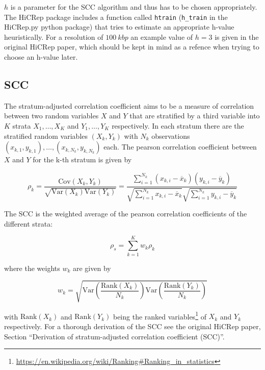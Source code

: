 \(h\) is a parameter for the SCC algorithm and thus has to be chosen appropriately. The HiCRep package includes a function called \verb|htrain| (\verb|h_train| in the HiCRep.py python package) that tries to estimate an appropriate h-value heuristically. For a resolution of \(\SI{100}{kbp}\) an example value of \( h = 3 \) is given in the original HiCRep paper, which should be kept in mind as a refence when trying to choose an h-value later.


\subsection{SCC} %
\label{subsec:scc}

The stratum-adjusted correlation coefficient aims to be a measure of correlation between two random variables \(X\) and \(Y\) that are stratified by a third variable into \(K\) strata \(X_1, \dots, X_K\) and \(Y_1, \dots, Y_K\) respectively. In each stratum there are the stratified random variables \((X_k, Y_k)\) with \(N_k\) observations \( (x_{k,1}, y_{k,1}), \dots, (x_{k,N_k}, y_{k,N_k}) \) each. The pearson correlation coefficient between \(X\) and \(Y\) for the k-th stratum is given by

\[
  \rho_k = \frac{ \mathrm{Cov}(X_k,Y_k) }{ \sqrt{ \mathrm{Var}(X_k) \mathrm{Var}(Y_k)} } = \frac{ \sum_{i=1}^{N_k} (x_{k,i} - \overbar{x}_k) (y_{k,i} - \overbar{y}_k) }{ \sqrt{ \sum_{i=1}^{N_k} x_{k,i} - \overbar{x}_k } \sqrt{ \sum_{i=1}^{N_k} y_{k,i} - \overbar{y}_k } }
\]

The SCC is the weighted average of the pearson correlation coefficients of the different strata:

\[
  \rho_s = \sum_{k=1}^{K} w_k \rho_k
\]

where the weights \(w_k\) are given by

\[
  w_k = \sqrt{ \mathrm{Var}\left( \frac{ \mathrm{Rank}(X_k) }{ N_k } \right) \mathrm{Var}\left( \frac{ \mathrm{Rank}(Y_k) }{ N_k } \right) }
\]

with \( \mathrm{Rank}(X_k) \) and \( \mathrm{Rank}(Y_k) \) being the ranked variables\footnote{\url{https://en.wikipedia.org/wiki/Ranking\#Ranking_in_statistics}} of \(X_k\) and \(Y_k\) respectively. For a thorough derivation of the SCC see the original \mbox{HiCRep} paper\cite{yang_hicrep_2017}, Section \enquote{Derivation of stratum-adjusted correlation coefficient (SCC)}.


